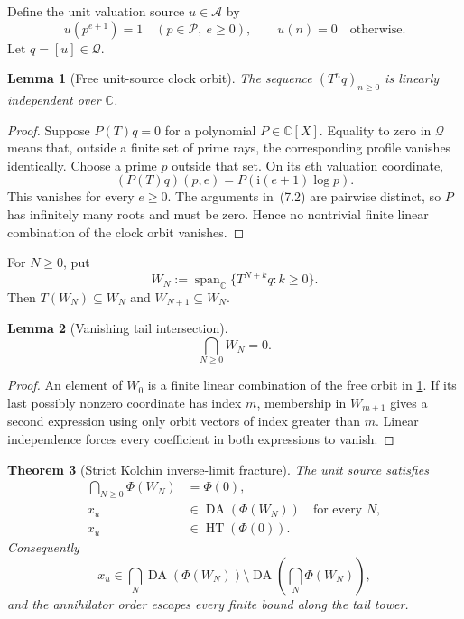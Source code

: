 \documentclass[11pt]{article}
\newtheorem{theorem}{Theorem}[section]
\newtheorem{lemma}[theorem]{Lemma}
\theoremstyle{definition}
\theoremstyle{remark}
\newcommand{\C}{\mathbb C}
\newcommand{\Pp}{\mathcal P}
\newcommand{\A}{\mathcal A}
\newcommand{\Q}{\mathcal Q}
\newcommand{\Span}{\operatorname{span}}
\newcommand{\DA}{\operatorname{DA}}
\newcommand{\HT}{\operatorname{HT}}
\begin{document}
Define the unit valuation source $u\in\A$ by
\[
  u(p^{e+1})=1\quad(p\in\Pp,\ e\geq0),
  \qquad u(n)=0\quad\text{otherwise}.                           \tag{7.1}
\]
Let $q=[u]\in\Q$.

\begin{lemma}[Free unit-source clock orbit]\label{lem:free-unit}
The sequence $(T^nq)_{n\geq0}$ is linearly independent over $\C$.
\end{lemma}

\begin{proof}
Suppose $P(T)q=0$ for a polynomial $P\in\C[X]$.  Equality to zero in $\Q$ means that, outside a
finite set of prime rays, the corresponding profile vanishes identically.  Choose a prime $p$
outside that set.  On its $e$th valuation coordinate,
\[
  (P(T)q)(p,e)=P\!\left(\mathrm i(e+1)\log p\right).            \tag{7.2}
\]
This vanishes for every $e\geq0$.  The arguments in~(7.2) are pairwise distinct, so $P$ has
infinitely many roots and must be zero.  Hence no nontrivial finite linear combination of the
clock orbit vanishes.
\end{proof}

For $N\geq0$, put
\[
  W_N:=\Span_{\C}\{T^{N+k}q:k\geq0\}.                          \tag{7.3}
\]
Then $T(W_N)\subseteq W_N$ and $W_{N+1}\subseteq W_N$.

\begin{lemma}[Vanishing tail intersection]\label{lem:tail-zero}
\[
  \bigcap_{N\geq0}W_N=0.                                       \tag{7.4}
\]
\end{lemma}

\begin{proof}
An element of $W_0$ is a finite linear combination of the free orbit in
\cref{lem:free-unit}.  If its last possibly nonzero coordinate has index $m$, membership in
$W_{m+1}$ gives a second expression using only orbit vectors of index greater than $m$.  Linear
independence forces every coefficient in both expressions to vanish.
\end{proof}

\begin{theorem}[Strict Kolchin inverse-limit fracture]\label{thm:fracture}
The unit source satisfies
\begin{align}
  \bigcap_{N\geq0}\Phi(W_N)&=\Phi(0),                           \tag{7.5}\\
  x_u&\in\DA(\Phi(W_N))\quad\text{for every }N,                 \tag{7.6}\\
  x_u&\in\HT(\Phi(0)).                                         \tag{7.7}
\end{align}
Consequently
\[
  x_u\in\bigcap_N\DA(\Phi(W_N))
  \setminus\DA\!\left(\bigcap_N\Phi(W_N)\right),              \tag{7.8}
\]
and the annihilator order escapes every finite bound along the tail tower.
\end{theorem}
\end{document}
